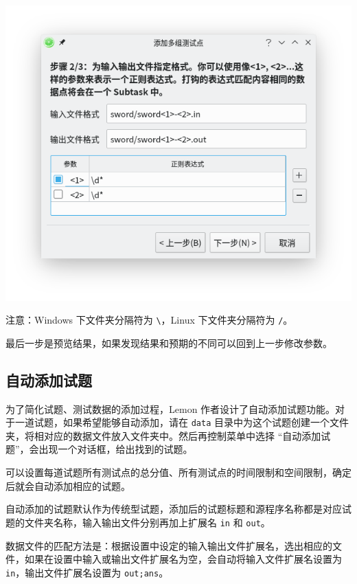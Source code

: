 \documentclass[UTF-8]{ctexart}
\begin{document}
			\begin{center}
			\includegraphics[scale=0.7]{pics/addtestcases.png}
			\end{center}
			
			注意：Windows 下文件夹分隔符为 \texttt{\textbackslash}，Linux 下文件夹分隔符为 \texttt{/}。
			
			最后一步是预览结果，如果发现结果和预期的不同可以回到上一步修改参数。
				
		\subsection{自动添加试题}
		
			为了简化试题、测试数据的添加过程，Lemon 作者设计了自动添加试题功能。对于一道试题，如果希望能够自动添加，请在 \texttt{data} 目录中为这个试题创建一个文件夹，将相对应的数据文件放入文件夹中。然后再控制菜单中选择 “自动添加试题”，会出现一个对话框，给出找到的试题。
			
			可以设置每道试题所有测试点的总分值、所有测试点的时间限制和空间限制，确定后就会自动添加相应的试题。
			
			自动添加的试题默认作为传统型试题，添加后的试题标题和源程序名称都是对应试题的文件夹名称，输入输出文件分别再加上扩展名 \texttt{in} 和 \texttt{out}。
			
			数据文件的匹配方法是：根据设置中设定的输入输出文件扩展名，选出相应的文件，如果在设置中输入或输出文件扩展名为空，会自动将输入文件扩展名设置为 \texttt{in}，输出文件扩展名设置为 \texttt{out;ans}。
			
\end{document}
